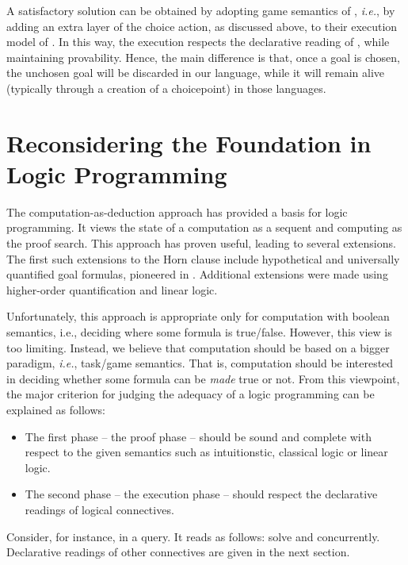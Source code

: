 \documentclass[letter]{ieice}
\newcommand{\ie}{{\em i.e.}}
\begin{document}
A  satisfactory solution can be obtained by adopting game semantics of \cite{Jap03}, \ie, by
adding an extra layer of the choice action, as discussed above,
 to their execution model of . In this way, 
 the execution respects the declarative
reading of , while maintaining provability.
Hence, the main difference is that, once a goal is chosen,
the unchosen goal will be discarded in our language, while it will remain alive (typically through a
creation of a choicepoint) in those languages.

\section{Reconsidering the Foundation in Logic Programming}\label{sec:intro}

 The computation-as-deduction approach\cite{MNPS91,Miller21} has provided a basis for logic programming.
It views the state of a computation as a sequent  and  computing as the  proof search. 
This approach has proven useful, leading to several extensions.
The first such extensions to the Horn clause include
 hypothetical and universally quantified goal formulas, pioneered in \cite{MNPS91}.
 Additional extensions were made using higher-order quantification and linear
logic\cite{HM94}.

Unfortunately,  this approach is appropriate only for  computation with boolean
semantics, i.e., deciding where some formula is true/false. However, this view is too limiting. 
Instead, we believe that computation should be based on a bigger paradigm, \ie, task/game semantics\cite{Jap03,Japtow}.
That is, computation should be interested in deciding whether some formula can be {\it made} true or not.
From this viewpoint, the major criterion for judging the adequacy of a 
logic programming can be explained as follows: 

\begin{itemize}

\item The first phase -- the proof phase -- should be sound and complete with respect to the given semantics such as intuitionstic, classical logic
 or linear logic.

\item The second phase -- the execution phase -- should respect the declarative readings of 
logical connectives.  

\end{itemize}
\noindent  
 Consider, for instance,   in a query. It reads as follows: solve  and  concurrently.
 Declarative readings of other connectives are given in the next section.
 
\end{document}
